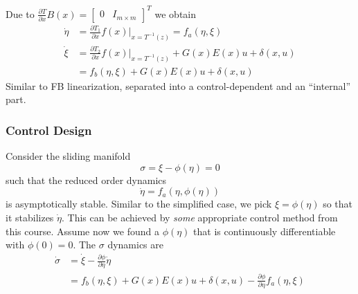 Due to $\frac{\partial T}{\partial x} B(x) =
    \begin{bmatrix}
        0 & I_{m \times m}
    \end{bmatrix}^T$ we obtain
\begin{align*}
    \dot{\eta} & = \frac{\partial T_1}{\partial x} f(x) \bigg|_{x = T^{-1}(z)} = f_a(\eta, \xi)           \\
    \dot{\xi}  & = \frac{\partial T_2}{\partial x} f(x) \bigg|_{x = T^{-1}(z)} + G(x)E(x)u + \delta(x, u) \\
               & = f_b(\eta, \xi) + G(x)E(x)u + \delta(x, u)
\end{align*}
Similar to FB linearization, separated into a control-dependent and an ``internal'' part.

\subsubsection{Control Design}

Consider the sliding manifold
\begin{equation*}
    \sigma = \xi - \phi(\eta) = 0
\end{equation*}
such that the reduced order dynamics
\begin{equation*}
    \dot{\eta} = f_a(\eta, \phi(\eta))
\end{equation*}
is asymptotically stable. Similar to the simplified case, we pick $\xi = \phi(\eta)$ so that it stabilizes $\dot{\eta}$. This can be achieved by \textit{some} appropriate control method from this course.
\newpar{}
Assume now we found a $\phi(\eta)$ that is continuously differentiable with $\phi(0) = 0$.
\newpar{}
The $\sigma$ dynamics are
\begin{align*}
    \dot{\sigma} & = \dot{\xi} - \frac{\partial \phi}{\partial \eta} \dot{\eta}                                     \\
                 & = f_b(\eta, \xi) + G(x)E(x)u + \delta(x, u) - \frac{\partial \phi}{\partial \eta} f_a(\eta, \xi)
\end{align*}
\newpar{}

